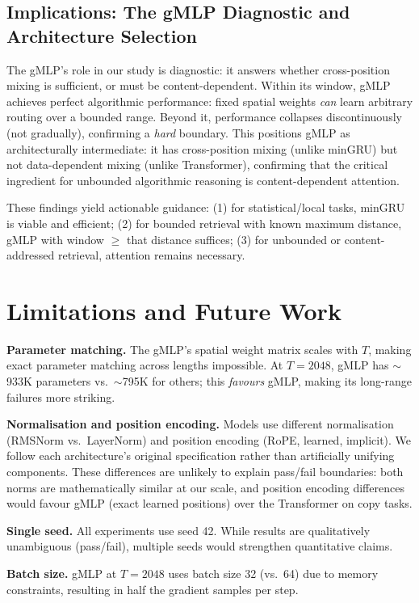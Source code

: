 \documentclass[10pt,a4paper]{article}
\begin{document}
\subsection{Implications: The gMLP Diagnostic and Architecture Selection}

The gMLP's role in our study is diagnostic: it answers whether cross-position mixing is sufficient, or must be content-dependent. Within its window, gMLP achieves perfect algorithmic performance: fixed spatial weights \emph{can} learn arbitrary routing over a bounded range. Beyond it, performance collapses discontinuously (not gradually), confirming a \emph{hard} boundary. This positions gMLP as architecturally intermediate: it has cross-position mixing (unlike minGRU) but not data-dependent mixing (unlike Transformer), confirming that the critical ingredient for unbounded algorithmic reasoning is content-dependent attention.

These findings yield actionable guidance: (1) for statistical/local tasks, minGRU is viable and efficient; (2) for bounded retrieval with known maximum distance, gMLP with window $\geq$ that distance suffices; (3) for unbounded or content-addressed retrieval, attention remains necessary.

\section{Limitations and Future Work}

\textbf{Parameter matching.} The gMLP's spatial weight matrix scales with $T$, making exact parameter matching across lengths impossible. At $T{=}2048$, gMLP has ${\sim}$933K parameters vs.\ ${\sim}$795K for others; this \emph{favours} gMLP, making its long-range failures more striking.

\textbf{Normalisation and position encoding.} Models use different normalisation (RMSNorm vs.\ LayerNorm) and position encoding (RoPE, learned, implicit). We follow each architecture's original specification rather than artificially unifying components. These differences are unlikely to explain pass/fail boundaries: both norms are mathematically similar at our scale, and position encoding differences would favour gMLP (exact learned positions) over the Transformer on copy tasks.

\textbf{Single seed.} All experiments use seed 42. While results are qualitatively unambiguous (pass/fail), multiple seeds would strengthen quantitative claims.

\textbf{Batch size.} gMLP at $T{=}2048$ uses batch size 32 (vs.\ 64) due to memory constraints, resulting in half the gradient samples per step.
\end{document}
